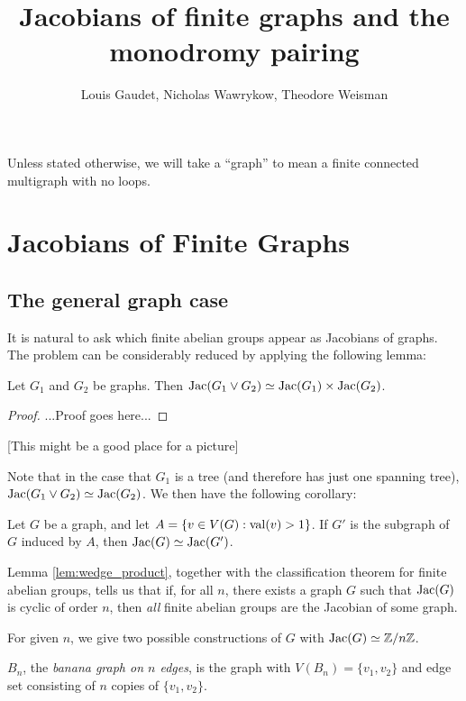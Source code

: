 \documentclass{amsart}
\title{Jacobians of finite graphs and the monodromy pairing}
\author{Louis Gaudet, Nicholas Wawrykow, Theodore Weisman}
\begin{document}
\maketitle

Unless stated otherwise, we will take a ``graph'' to mean a finite
connected multigraph with no loops.

\section{Jacobians of Finite Graphs}

\subsection{The general graph case}
It is natural to ask which finite abelian groups appear as Jacobians
of graphs. The problem can be considerably reduced by applying the
following lemma:

\begin{lem}
\label{lem:wedge_product}
Let $G_1$ and $G_2$ be graphs. Then $\operatorname{Jac}(G_1 \vee G_2) \simeq
\operatorname{Jac}(G_1) \times \operatorname{Jac}(G_2)$.
\end{lem}
\begin{proof}
  ...Proof goes here...
\end{proof}

[This might be a good place for a picture]

Note that in the case that $G_1$ is a tree (and therefore has just one
spanning tree), $\operatorname{Jac}(G_1 \vee G_2) \simeq \operatorname{Jac}(G_2)$. We then have
the following corollary:
\begin{cor}
  \label{cor:1_valent}
  Let $G$ be a graph, and let $A = \{v \in V(G) : \operatorname{val}(v) > 1\}$. If
  $G'$ is the subgraph of $G$ induced by $A$, then $\operatorname{Jac}(G) \simeq
  \operatorname{Jac}(G')$.
\end{cor}

Lemma \ref{lem:wedge_product}, together with the classification
theorem for finite abelian groups, tells us that if, for all $n$,
there exists a graph $G$ such that $\operatorname{Jac}(G)$ is cyclic of order $n$,
then \emph{all} finite abelian groups are the Jacobian of some graph.

For given $n$, we give two possible constructions of $G$ with $\operatorname{Jac}(G)
\simeq \mathbb{Z}/n\mathbb{Z}$.

\begin{defn}
  $B_n$, the \emph{banana graph on $n$ edges}, is the graph with
  $V(B_n) = \{v_1, v_2\}$ and edge set consisting of $n$ copies of
  $\{v_1, v_2\}$.
\end{defn}
\end{document}
